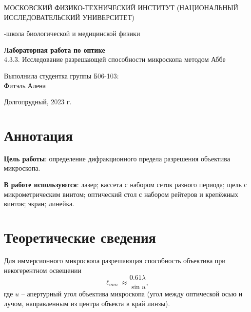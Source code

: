 \documentclass[a4paper,12pt]{article}
\begin{document}
\def\figurename{Рисунок}
\begin{titlepage}
\begin{center}
    {\large МОСКОВСКИЙ ФИЗИКО-ТЕХНИЧЕСКИЙ ИНСТИТУТ (НАЦИОНАЛЬНЫЙ ИССЛЕДОВАТЕЛЬСКИЙ УНИВЕРСИТЕТ)}
\end{center}
\begin{center}
    {-школа биологической и медицинской физики}
\end{center}

\vspace{1cm}
{\huge
\begin{center}
    {\bf Лабораторная работа по оптике}\\
    \vspace{0.5cm}
    4.3.3. Исследование разрешающей способности микроскопа методом Аббе
\end{center}
}

\vspace{4cm}
\begin{flushright}
{\LARGE Выполнила студентка группы Б06-103:\\ Фитэль Алена \\}

\end{flushright}
\vspace{9cm}
\begin{center}
    Долгопрудный, 2023 г.
\end{center}
\end{titlepage}
\newpage


\section{Аннотация}

\textbf{Цель работы}: определение дифракционного предела разрешения объектива микроскопа.

\textbf{В работе используются}: лазер; кассета с набором сеток разного периода; щель с микрометрическим винтом; оптический стол с набором рейтеров и крепёжных винтов; экран; линейка.


\section{Теоретические сведения}
Для иммерсионного микроскопа разрешающая способность объектива при некогерентном освещении
\begin{equation}
\ell_{min} \approx \dfrac{0.61\lambda}{\sin u},
\end{equation}
где $u$ -- апертурный угол объектива микроскопа (угол между оптической осью и лучом, направленным из центра объекта в край линзы).
\end{document}
